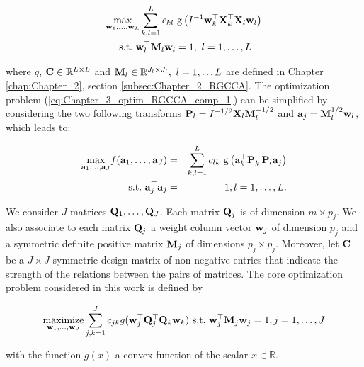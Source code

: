 \documentclass[
]{jss}
\begin{document}
\begin{equation}
    \begin{gathered}
        \underset{\mathbf{w}_1, \ldots,\mathbf{w}_L}{\text{max}} \sum_{\substack{k, l = 1}}^L c_{kl} \text{ g}\left(I^{-1}\mathbf{w}_k^\top \mathbf{X}_k ^\top \mathbf{X}_l \mathbf{w}_l \right)
        \\
        \text{~s.t.~} \mathbf{w}_l^\top\mathbf{M}_l\mathbf{w}_l = 1,~ l = 1, \ldots, L
    \label{eq:Chapter_3_optim_RGCCA_comp_1}
    \end{gathered}
\end{equation}

where \(g\), \(\mathbf{C}\in\mathbb{R}^{L\times L}\) and
\(\mathbf{M}_l\in\mathbb{R}^{J_l\times J_l}, ~l=1, \ldots L\) are defined in
Chapter \ref{chap:Chapter_2}, section \ref{subsec:Chapter_2_RGCCA}. The
optimization problem (\ref{eq:Chapter_3_optim_RGCCA_comp_1}) can be
simplified by considering the two following transforms
\(\mathbf{P}_l = I^{-1/2}\mathbf{X}_l\mathbf{M}_l^{-1/2}\) and
\(\mathbf{a}_j = \mathbf{M}_l^{1/2}\mathbf{w}_l\), which leads to:

\begin{eqnarray}
    \displaystyle \underset{\mathbf{a}_1, \ldots,\mathbf{a}_J}{\text{max}} f(\mathbf{a}_1, \ldots, \mathbf{a}_J) &=& \sum_{\substack{k, l = 1}}^L c_{lk} \text{ g}\left(\mathbf{a}_k^\top \mathbf{P}_k^\top \mathbf{P}_l \mathbf{a}_j \right) \label{eq:Chapter_3_optim_RGCCA_one_comp_VARCHANGED}\\
    \text{~s.t.~} \mathbf{a}_j^\top\mathbf{a}_j &=& 1 , l = 1, \ldots, L \label{eq:Chapter_3_optim_RGCCA_one_comp_VARCHANGED_constr}.
\end{eqnarray}

We consider \(J\) matrices \(\mathbf{Q}_1, \ldots, \mathbf{Q}_J\). Each matrix \(\mathbf{Q}_j\)
is of dimension \(m \times p_j\). We also associate to each matrix
\(\mathbf{Q}_j\) a weight column vector \(\mathbf{w}_j\) of dimension \(p_j\) and a
symmetric definite positive matrix \(\mathbf{M}_j\) of dimensions
\(p_j \times p_j\). Moreover, let \(\mathbf{C}\) be a \(J \times J\)
symmetric design matrix of non-negative entries that indicate the
strength of the relations between the pairs of matrices. The core
optimization problem considered in this work is defined by

\begin{equation}
    \underset{\mathbf{w}_1, \ldots, \mathbf{w}_J}{\text{maximize}} \displaystyle \sum_{j, k=1}^J c_{jk}g(\mathbf{w}_j^\top\mathbf{Q}_j^\top \mathbf{Q}_k\mathbf{w}_k) \mathrm{~s.t.~} \mathbf{w}_j^\top\mathbf{M}_j\mathbf{w}_j = 1, j = 1, \ldots, J
   \label{for:RGCCA1}
\end{equation}

with the function \(g(x)\) a convex function of the scalar
\(x \in \mathbb{R}\).
\end{document}
